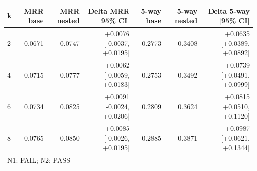 \begin{tabular}{lrrrrrr}
\toprule
k & MRR base & MRR nested & Delta MRR [95\% CI] & 5-way base & 5-way nested & Delta 5-way [95\% CI] \\
\midrule
2 & 0.0671 & 0.0747 & +0.0076 [-0.0037, +0.0195] & 0.2773 & 0.3408 & +0.0635 [+0.0389, +0.0892] \\
4 & 0.0715 & 0.0777 & +0.0062 [-0.0059, +0.0183] & 0.2753 & 0.3492 & +0.0739 [+0.0491, +0.0999] \\
6 & 0.0734 & 0.0825 & +0.0091 [-0.0024, +0.0206] & 0.2809 & 0.3624 & +0.0815 [+0.0510, +0.1120] \\
8 & 0.0765 & 0.0850 & +0.0085 [-0.0026, +0.0195] & 0.2885 & 0.3871 & +0.0987 [+0.0621, +0.1344] \\
\midrule
\multicolumn{7}{l}{N1: FAIL; N2: PASS} \\
\bottomrule
\end{tabular}
